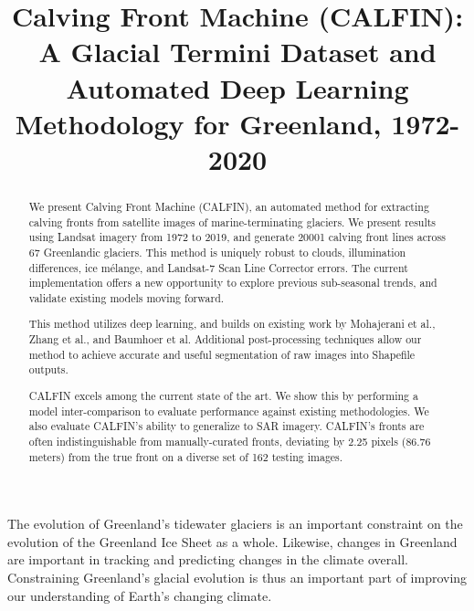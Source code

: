 \documentclass[tc, manuscript]{copernicus}
\begin{document}
\title{Calving Front Machine (CALFIN): A Glacial Termini Dataset and Automated Deep Learning Methodology for Greenland, 1972-2020}






\received{}
\pubdiscuss{} %
\revised{}
\accepted{}
\published{}

\maketitle

\begin{abstract}
We present Calving Front Machine (CALFIN), an automated method for extracting calving fronts  from satellite images of marine-terminating glaciers. We present results using Landsat imagery from 1972 to 2019, and generate 20001 calving front lines across 67 Greenlandic glaciers. This method is uniquely robust to clouds, illumination differences, ice mélange, and Landsat-7 Scan Line Corrector errors. The current implementation offers a new opportunity to explore previous sub-seasonal trends, and validate existing models moving forward.

This method utilizes deep learning, and builds on existing work by Mohajerani et al., Zhang et al., and Baumhoer et al. Additional post-processing techniques allow our method to achieve accurate and useful segmentation of raw images into Shapefile outputs. 

CALFIN excels among the current state of the art. We show this by performing a model inter-comparison to evaluate performance against existing methodologies. We also evaluate CALFIN's ability to generalize to SAR imagery. CALFIN's fronts are often indistinguishable from manually-curated fronts, deviating by 2.25 pixels (86.76 meters) from the true front on a diverse set of 162 testing images.
\end{abstract}

\introduction
\label{sec:intro}
The evolution of Greenland's tidewater glaciers is an important constraint on the evolution of the Greenland Ice Sheet as a whole. Likewise, changes in Greenland are important in tracking and predicting changes in the climate overall. Constraining Greenland's glacial evolution is thus an important part of improving our understanding of Earth's changing climate.
\end{document}
